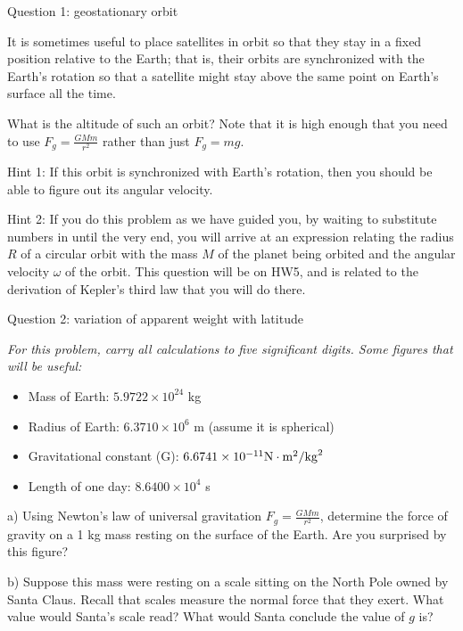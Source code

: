 \documentclass[12pt]{article}
\newcommand{\BI}{\begin{itemize}}
\newcommand{\EI}{\end{itemize}}
\begin{document}
\Large
\centerline{}
\normalsize
\centerline{}

\medskip


\centerline{\Large Question 1: geostationary orbit}

It is sometimes useful to place satellites in orbit so that they stay in a fixed position relative to the
Earth; that is, their orbits are synchronized with the Earth's rotation so that a satellite might stay
above the same point on Earth’s surface all the time.

What is the altitude of such an orbit? Note that it is high enough that you need to use $F_g=\frac{GMm}{r^2}$
rather than just $F_g = mg$.

{\sc Hint 1:} If this orbit is synchronized with Earth's rotation, then you should be able to figure out its
angular velocity.

{\sc Hint 2:} If you do this problem as we have guided you, by waiting to substitute numbers in until the 
very end, you will arrive at an expression relating the radius $R$ of a circular orbit with the mass $M$ of the 
planet being orbited and the angular velocity $\omega$ of the orbit. This question will be on HW5, and is related
to the derivation of Kepler's third law that you will do there.

\newpage

\centerline{\Large Question 2: variation of apparent weight with latitude}

\medskip

\it For this problem, carry all calculations to five significant digits. Some figures that will be useful:

\rm
\BI
\item Mass of Earth: $5.9722\times 10^{24}$ kg
\item Radius of Earth: $ 6.3710 \times 10^6$ m (assume it is spherical)
\item Gravitational constant (G): $6.6741 \times 10^{-11} \rm N\cdot \rm m^2/{\rm kg}^2$
\item Length of one day: $8.6400 \times 10^4$ s
\EI


a) Using Newton's law of universal gravitation $F_g=\frac{GMm}{r^2}$, determine the force of gravity on a 1 kg mass resting on the surface of the Earth. Are you surprised by this figure?


\vspace{2in}

b) Suppose this mass were resting on a scale sitting on the North Pole owned by Santa Claus. Recall that scales measure
the normal force that they exert. What value would Santa's scale read? What would Santa conclude the value of $g$ is?
\end{document}
